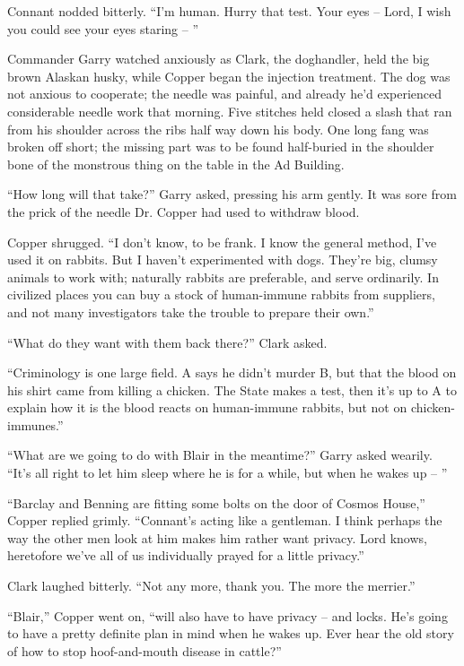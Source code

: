 \documentclass[ebook,oneside,11pt]{memoir}				%
\begin{document}
Connant nodded bitterly. ``I'm human. Hurry that test. Your eyes -- Lord, I wish you could see your eyes staring -- ''

Commander Garry watched anxiously as Clark, the doghandler, held the big brown Alaskan husky, while Copper began the injection treatment. The dog was not anxious to cooperate; the needle was painful, and already he'd experienced considerable needle work that morning. Five stitches held closed a slash that ran from his shoulder across the ribs half way down his body. One long fang was broken off short; the missing part was to be found half-buried in the shoulder bone of the monstrous thing on the table in the Ad Building.

``How long will that take?'' Garry asked, pressing his arm gently. It was sore from the prick of the needle Dr. Copper had used to withdraw blood.

Copper shrugged. ``I don't know, to be frank. I know the general method, I've used it on rabbits. But I haven't experimented with dogs. They're big, clumsy animals to work with; naturally rabbits are preferable, and serve ordinarily. In civilized places you can buy a stock of human-immune rabbits from suppliers, and not many investigators take the trouble to prepare their own.''

``What do they want with them back there?'' Clark asked.

``Criminology is one large field. A says he didn't murder B, but that the blood on his shirt came from killing a chicken. The State makes a test, then it's up to A to explain how it is the blood reacts on human-immune rabbits, but not on chicken-immunes.''

``What are we going to do with Blair in the meantime?'' Garry asked wearily. ``It's all right to let him sleep where he is for a while, but when he wakes up -- ''

``Barclay and Benning are fitting some bolts on the door of Cosmos House,'' Copper replied grimly. ``Connant's acting like a gentleman. I think perhaps the way the other men look at him makes him rather want privacy. Lord knows, heretofore we've all of us individually prayed for a little privacy.''

Clark laughed bitterly. ``Not any more, thank you. The more the merrier.''

``Blair,'' Copper went on, ``will also have to have privacy -- and locks. He's going to have a pretty definite plan in mind when he wakes up. Ever hear the old story of how to stop hoof-and-mouth disease in cattle?''
\end{document}
